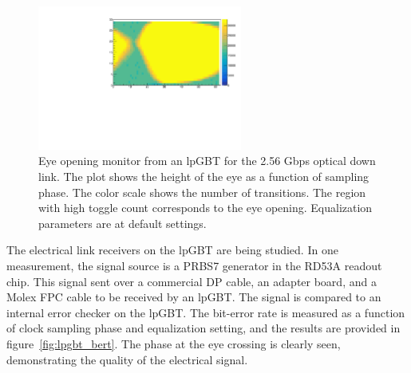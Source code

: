 \documentclass[a4paper,11pt]{article}
\begin{document}

\begin{figure}[htbp]
\centering
\includegraphics[width=0.6\textwidth,origin=c]{../figures/lpGBT_eye.pdf}
\caption{
\label{fig:lpgbt_eye}
Eye opening monitor from an lpGBT for the 2.56 Gbps optical down link.
The plot shows the height of the eye as a function of sampling phase.
The color scale shows the number of transitions.
The region with high toggle count corresponds to the eye opening.
Equalization parameters are at default settings.
}
\end{figure}


The electrical link receivers on the lpGBT are being studied.
In one measurement, the signal source is a PRBS7 generator in the RD53A readout chip.
This signal sent over a commercial DP cable, an adapter board, and a Molex FPC cable to be received by an lpGBT.
The signal is compared to an internal error checker on the lpGBT.
The bit-error rate is measured as a function of clock sampling phase and equalization setting, and the results are provided in figure~\ref{fig:lpgbt_bert}.
The phase at the eye crossing is clearly seen, demonstrating the quality of the electrical signal.

\end{document}
